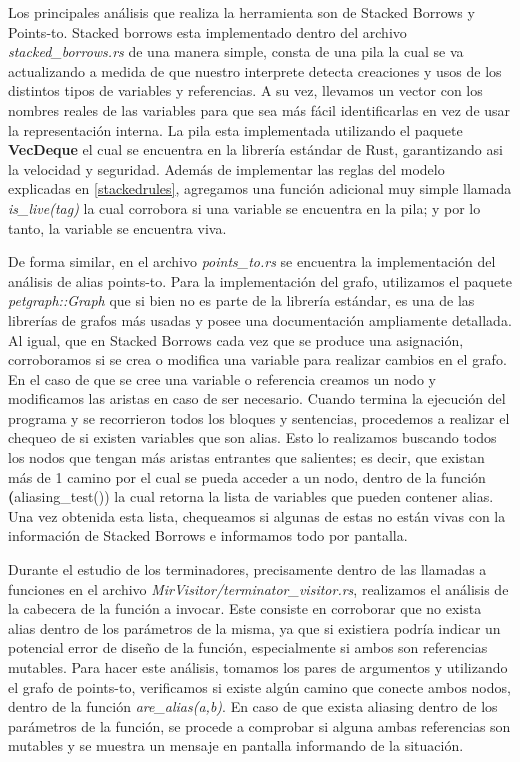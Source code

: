 Los principales análisis que realiza la herramienta son de Stacked Borrows y Points-to. Stacked borrows esta implementado dentro del archivo \textit{stacked\_borrows.rs} de una manera simple, consta de una pila la cual se va actualizando a medida de que nuestro interprete detecta creaciones y usos de los distintos tipos de variables y referencias. A su vez, llevamos un vector con los nombres reales de las variables para que sea más fácil identificarlas en vez de usar la representación interna. La pila esta implementada utilizando el paquete \textbf{VecDeque} el cual se encuentra en la librería estándar de Rust, garantizando asi la velocidad y seguridad. Además de implementar las reglas del modelo explicadas en \ref{stackedrules}, agregamos una función adicional muy simple llamada \textit{is\_live(tag)} la cual corrobora si una variable se encuentra en la pila; y por lo tanto, la variable se encuentra viva.

De forma similar, en el archivo \textit{points\_to.rs} se encuentra la implementación del análisis de alias points-to.
Para la implementación del grafo, utilizamos el paquete \textit{petgraph::Graph} que si bien no es parte de la librería estándar, es una de las librerías de grafos más usadas y posee una documentación ampliamente detallada. Al igual, que en Stacked Borrows cada vez que se produce una asignación, corroboramos si se crea o modifica una variable para realizar cambios en el grafo. En el caso de que se cree una variable o referencia creamos un nodo y modificamos las aristas en caso de ser necesario. Cuando termina la ejecución del programa y se recorrieron todos los bloques y sentencias, procedemos a realizar el chequeo de si existen variables que son alias. Esto lo realizamos buscando todos los nodos que tengan más aristas entrantes que salientes; es decir, que existan más de 1 camino por el cual se pueda acceder a un nodo, dentro de la función \textbf(aliasing\_test()) la cual retorna la lista de variables que pueden contener alias. Una vez obtenida esta lista, chequeamos si algunas de estas no están vivas con la información de Stacked Borrows e informamos todo por pantalla.

Durante el estudio de los terminadores, precisamente dentro de las llamadas a funciones en el archivo \textit{MirVisitor/terminator\_visitor.rs}, realizamos el análisis de la cabecera de la función a invocar. Este consiste en corroborar que no exista alias dentro de los parámetros de la misma, ya que si existiera podría indicar un potencial error de diseño de la función, especialmente si ambos son referencias mutables. Para hacer este análisis, tomamos los pares de argumentos y utilizando el grafo de points-to, verificamos si existe algún camino que conecte ambos nodos, dentro de la función \textit{are\_alias(a,b)}. En caso de que exista aliasing dentro de los parámetros de la función, se procede a comprobar si alguna ambas referencias son mutables y se muestra un mensaje en pantalla informando de la situación.

